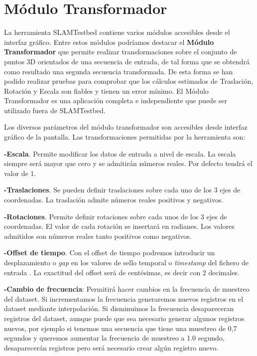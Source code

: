  
\section{Módulo Transformador}
La herramienta SLAMTestbed contiene varios módulos accesibles desde el interfaz gráfico. Entre estos módulos podríamos destacar el \textbf{Módulo Transformador} que permite
realizar transformaciones sobre el conjunto de puntos 3D orientados de una secuencia de entrada, de tal forma que se obtendrá como resultado una segunda secuencia transformada. De esta forma se han podido realizar pruebas para comprobar que los cálculos estimados de Traslación, Rotación y Escala son fiables y tienen un error mínimo.
El Módulo Transformador es una aplicación completa e independiente que  puede ser utilizado fuera de SLAMTestbed. 

Los diversos parámetros del módulo transformador son accesibles desde interfaz gráfico de la pantalla. Las transformaciones permitidas por la herramienta son:

\textbf{-Escala}. Permite modificar los datos de entrada a nivel de escala. La escala siempre será mayor que cero y se admitirán números reales. Por defecto tendrá el valor de 1. 

\textbf{-Traslaciones}. Se pueden definir traslaciones sobre cada uno de los 3 ejes de coordenadas. La traslación admite números reales positivos y negativos.

\textbf{-Rotaciones}. Permite definir rotaciones sobre cada unos de los 3 ejes de coordenadas. El valor de cada rotación se insertará en radianes. Los valores admitidos son números reales tanto positivos como negativos. 

\textbf{-Offset de tiempo}. Con el offset de tiempo podremos introducir un desplazamiento o \textit{gap} en los valores de sello temporal o \textit{timestamp} del fichero de entrada . La exactitud del offset será de centésimas, es decir con 2 decimales.

\textbf{-Cambio de frecuencia}: Permitirá hacer cambios en la frecuencia de muestreo del dataset. Si incrementamos la frecuencia generaremos nuevos registros en el dataset mediante interpolación. Si disminuimos la frecuencia desapareceran registros del dataset, aunque puede que sea necesario generar algunos registros nuevos, por ejemplo si tenemos una secuencia que tiene una muestreo de 0,7 segundos y queremos aumentar la frecuencia de muestreo a 1.0 segundo, desaparecerán registros pero será necesario crear algún registro nuevo.

